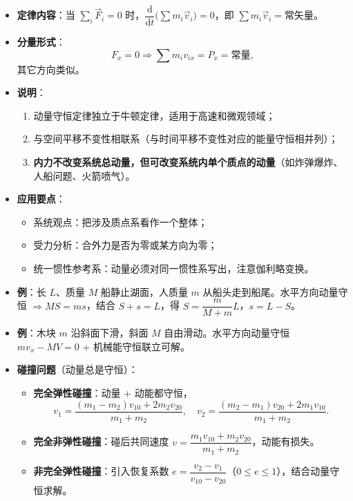 \documentclass[12pt,a4paper]{ctexart}
\begin{document}
\begin{itemize}
    \item \textbf{定律内容}：当 $\sum_i \vec{F}_i = 0$ 时，$\dfrac{\mathrm{d}}{\mathrm{d}t}\bigl(\sum m_i\vec{v}_i\bigr) = 0$，即 $\sum m_i\vec{v}_i = \text{常矢量}$。
    \item \textbf{分量形式}：
    \[
        F_x = 0 \Rightarrow \sum m_i v_{ix} = P_x = \text{常量},
    \]
    其它方向类似。
    \item \textbf{说明}：
    \begin{enumerate}
        \item 动量守恒定律独立于牛顿定律，适用于高速和微观领域；
        \item 与空间平移不变性相联系（与时间平移不变性对应的能量守恒相并列）；
        \item \textbf{内力不改变系统总动量，但可改变系统内单个质点的动量}（如炸弹爆炸、人船问题、火箭喷气）。
    \end{enumerate}
    \item \textbf{应用要点}：
    \begin{itemize}
        \item 系统观点：把涉及质点系看作一个整体；
        \item 受力分析：合外力是否为零或某方向为零；
        \item 统一惯性参考系：动量必须对同一惯性系写出，注意伽利略变换。
    \end{itemize}
    \item \textbf{例}：长 $L$、质量 $M$ 船静止湖面，人质量 $m$ 从船头走到船尾。水平方向动量守恒 $\Rightarrow MS = ms$，结合 $S + s = L$，得 $S = \dfrac{m}{M+m}L$，$s = L - S$。
    \item \textbf{例}：木块 $m$ 沿斜面下滑，斜面 $M$ 自由滑动。水平方向动量守恒 $mv_x - MV = 0$ + 机械能守恒联立可解。
    \item \textbf{碰撞问题}（动量总是守恒）：
    \begin{itemize}
        \item \textbf{完全弹性碰撞}：动量 + 动能都守恒，
        \[
            v_1 = \frac{(m_1 - m_2)v_{10} + 2m_2 v_{20}}{m_1 + m_2},\quad
            v_2 = \frac{(m_2 - m_1)v_{20} + 2m_1 v_{10}}{m_1 + m_2}.
        \]
        \item \textbf{完全非弹性碰撞}：碰后共同速度 $v = \dfrac{m_1 v_{10} + m_2 v_{20}}{m_1 + m_2}$，动能有损失。
        \item \textbf{非完全弹性碰撞}：引入恢复系数 $e = \dfrac{v_2 - v_1}{v_{10} - v_{20}}$（$0 \le e \le 1$），结合动量守恒求解。
    \end{itemize}

\end{itemize}
\end{document}
